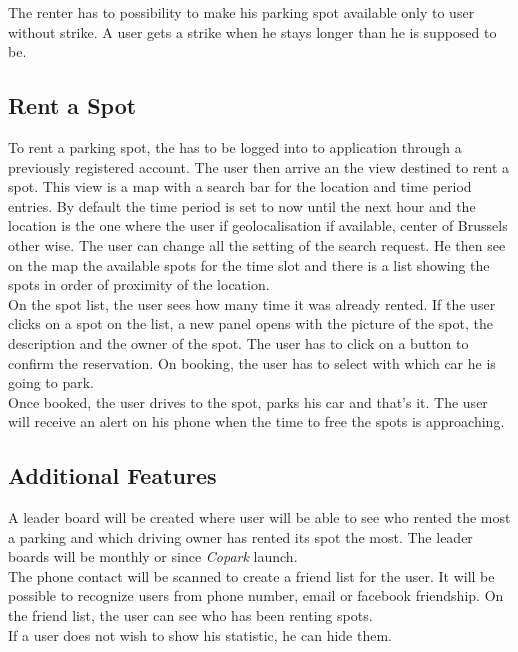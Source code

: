 \documentclass[12pt,a4paper,oneside]{book}
\newcommand{\bp}{\textit{Copark }}
\begin{document}
The renter has to possibility to make his parking spot available only to user without strike. A user gets a strike when he stays longer than he is supposed to be.

\subsection{Rent a Spot}
To rent a parking spot, the has to be logged into to application through a previously registered account. The user then arrive an the view destined to rent a spot. This view is a map with a search bar for the location and time period entries. By default the time period is set to now until the next hour and the location is the one where the user if geolocalisation if available, center of Brussels other wise. The user can change all the setting of the search request. He then see on the map the available spots for the time slot and there is a list showing the spots in order of proximity of the location.\\

On the spot list, the user sees how many time it was already rented. If the user clicks on a spot on the list, a new panel opens with the picture of the spot, the description and the owner of the spot. The user has to click on a button to confirm the reservation. On booking, the user has to select with which car he is going to park.\\

Once booked, the user drives to the spot, parks his car and that's it. The user will receive an alert on his phone when the time to free the spots is approaching.

\subsection{Additional Features}
\label{feedes}
A leader board will be created where user will be able to see who rented the most a parking and which driving owner has rented its spot the most. The leader boards will be monthly or since \bp launch.\\
The phone contact will be scanned to create a friend list for the user. It will be possible to recognize users from phone number, email or facebook friendship. On the friend list, the user can see who has been renting spots.\\
If a user does not wish to show his statistic, he can hide them.\\
\end{document}
